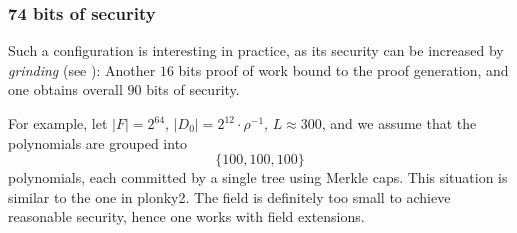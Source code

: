\documentclass[11pt,article,oneside]{memoir}
\theoremstyle{definition}
\theoremstyle{remark}
\begin{document}
\subsubsection{74 bits of security}

Such a configuration is interesting in practice, as its security can be increased by \textit{grinding} (see \cite{ethSTARK}): 
Another $16$ bits proof of work bound to the proof generation, and one obtains overall  $90$ bits of security. 

For example, let $|F|=2^{64}$, $|D_0|=2^{12}\cdot\rho^{-1}$, $L\approx 300$, and we assume that the polynomials are grouped into 
\[
\{100,100,100\} 
\]
polynomials, each committed by a single tree using Merkle caps. 
This situation is similar to the one in plonky2. 
The field is definitely too small to achieve reasonable security, hence one works with field extensions. 
\end{document}

